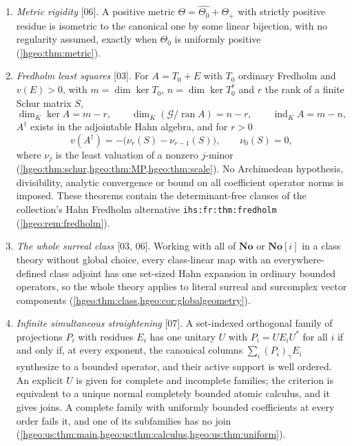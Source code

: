 \documentclass[11pt,letterpaper]{article}
\numberwithin{equation}{section}
\theoremstyle{definition}
\theoremstyle{remark}
\newcommand{\No}{\mathbf{No}}
\newcommand{\K}{K}
\newcommand{\ran}{\operatorname{ran}}
\newcommand{\ind}{\operatorname{ind}}
\newcommand{\cG}{\mathcal G}
\newcommand{\src}[1]{\textup{\textsf{\small[#1]}}}
\newcommand{\replabel}[1]{\nolinkurl{#1}}
\begin{document}
\begin{enumerate}[label=\textup{(\arabic*)},leftmargin=2.2em]
(\cref{hgeo:thm:lattice}); a positive operator with exponents $0,\eta,2\eta$
has a noncomplemented kernel (\cref{hgeo:thm:positivekernel}); a countable
family of mutually orthogonal rank-one projections has no least upper bound,
and countable simultaneous straightening fails for two distinct reasons
(\cref{hgeo:thm:nojoin,hgeo:cor:nosimultaneous,hgeo:prop:incoherent}).
\item \emph{Metric rigidity} \src{06}. A positive metric
$\Theta=\widehat{\Theta_0}+\Theta_+$ with strictly positive residue is
isometric to the canonical one by some linear bijection, with no regularity
assumed, exactly when $\Theta_0$ is uniformly positive
(\cref{hgeo:thm:metric}).
\item \emph{Fredholm least squares} \src{03}. For $A=T_0+E$ with $T_0$
ordinary Fredholm and $v(E)>0$, with $m=\dim\ker T_0$, $n=\dim\ker T_0^*$
and $r$ the rank of a finite Schur matrix $S$,
\[
 \dim_\K\ker A=m-r,\qquad
 \dim_\K(\cG/\ran A)=n-r,\qquad
 \ind_\K A=m-n,
\]
$A^\dagger$ exists in the adjointable Hahn algebra, and for $r>0$
\[
 v(A^\dagger)=-\bigl(\nu_r(S)-\nu_{r-1}(S)\bigr),
 \qquad \nu_0(S)=0,
\]
where $\nu_j$ is the least valuation of a nonzero $j$-minor
(\cref{hgeo:thm:schur,hgeo:thm:MP,hgeo:thm:scale}). No Archimedean
hypothesis, divisibility, analytic convergence or bound on all coefficient
operator norms is imposed. These theorems contain the determinant-free
clauses of the collection's Hahn Fredholm alternative
\replabel{ihs:fr:thm:fredholm} (\cref{hgeo:rem:fredholm}).
\item \emph{The whole surreal class} \src{03, 06}. Working with all of $\No$
or $\No[i]$ in a class theory without global choice, every class-linear map
with an everywhere-defined class adjoint has one set-sized Hahn expansion in
ordinary bounded operators, so the whole theory applies to literal surreal
and surcomplex vector components (\cref{hgeo:thm:class,hgeo:cor:globalgeometry}).
\item \emph{Infinite simultaneous straightening} \src{07}. A set-indexed
orthogonal family of projections $P_i$ with residues $E_i$ has one unitary
$U$ with $P_i=UE_iU^*$ for all $i$ if and only if, at every exponent, the
canonical columns $\sum_i(P_i)_\gamma E_i$ synthesize to a bounded operator,
and their active support is well ordered. An explicit $U$ is given for
complete and incomplete families; the criterion is equivalent to a unique
normal completely bounded atomic calculus, and it gives joins. A complete
family with uniformly bounded coefficients at every order fails it, and one
of its subfamilies has no join
(\cref{hgeo:us:thm:main,hgeo:us:thm:calculus,hgeo:us:thm:uniform}).
\end{enumerate}
\end{document}
